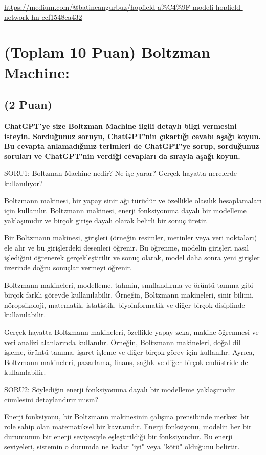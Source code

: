 \documentclass[11pt]{article}
\begin{document}
\url{https://medium.com/@batincangurbuz/hopfield-a%C4%9F-modeli-hopfield-network-hn-ccf1548ca432}

\section{(Toplam 10 Puan) Boltzman Machine:}

\subsection{(2 Puan)} \textbf{ChatGPT’ye size Boltzman Machine ilgili detaylı bilgi vermesini isteyin. Sorduğunuz soruyu, ChatGPT'nin çıkartığı cevabı aşağı koyun. Bu cevapta anlamadığınız terimleri de ChatGPT’ye sorup, sorduğunuz soruları ve ChatGPT’nin verdiği cevapları da sırayla aşağı koyun.}

SORU1: Boltzman Machine nedir? Ne işe yarar? Gerçek hayatta nerelerde kullanılıyor?

Boltzmann makinesi, bir yapay sinir ağı türüdür ve özellikle olasılık hesaplamaları için kullanılır. Boltzmann makinesi, enerji fonksiyonuna dayalı bir modelleme yaklaşımıdır ve birçok girişe dayalı olarak belirli bir sonuç üretir.

Bir Boltzmann makinesi, girişleri (örneğin resimler, metinler veya veri noktaları) ele alır ve bu girişlerdeki desenleri öğrenir. Bu öğrenme, modelin girişleri nasıl işlediğini öğrenerek gerçekleştirilir ve sonuç olarak, model daha sonra yeni girişler üzerinde doğru sonuçlar vermeyi öğrenir.

Boltzmann makineleri, modelleme, tahmin, sınıflandırma ve örüntü tanıma gibi birçok farklı görevde kullanılabilir. Örneğin, Boltzmann makineleri, sinir bilimi, nöropsikoloji, matematik, istatistik, biyoinformatik ve diğer birçok disiplinde kullanılabilir.

Gerçek hayatta Boltzmann makineleri, özellikle yapay zeka, makine öğrenmesi ve veri analizi alanlarında kullanılır. Örneğin, Boltzmann makineleri, doğal dil işleme, örüntü tanıma, işaret işleme ve diğer birçok görev için kullanılır. Ayrıca, Boltzmann makineleri, pazarlama, finans, sağlık ve diğer birçok endüstride de kullanılabilir.


SORU2: Söylediğin enerji fonksiyonuna dayalı bir modelleme yaklaşımıdır cümlesini detaylandırır mısın?

Enerji fonksiyonu, bir Boltzmann makinesinin çalışma prensibinde merkezi bir role sahip olan matematiksel bir kavramdır. Enerji fonksiyonu, modelin her bir durumunun bir enerji seviyesiyle eşleştirildiği bir fonksiyondur. Bu enerji seviyeleri, sistemin o durumda ne kadar "iyi" veya "kötü" olduğunu belirtir.
\end{document}
